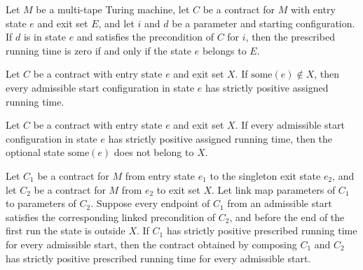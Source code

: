 \begin{theorem}
\label{Turing.Contract.time_eq_zero_iff}
\leanok
{}
Let $M$ be a multi-tape Turing machine, let $C$ be a contract for $M$ with entry state
$e$ and exit set $E$, and let $i$ and $d$ be a parameter and starting configuration. If
$d$ is in state $e$ and satisfies the precondition of $C$ for $i$, then the prescribed
running time is zero if and only if the state $e$ belongs to $E$.
\end{theorem}

\begin{theorem}
\label{Turing.Contract.positive_of_not_mem}
\leanok
{}
Let $C$ be a contract with entry state $e$ and exit set $X$. If
$\mathrm{some}(e)\notin X$, then every admissible start configuration in state $e$ has
strictly positive assigned running time.
\end{theorem}

\begin{theorem}
\label{Turing.Contract.not_mem_of_positive}
\leanok
{}
Let $C$ be a contract with entry state $e$ and exit set $X$. If every admissible start
configuration in state $e$ has strictly positive assigned running time, then the
optional state $\mathrm{some}(e)$ does not belong to $X$.
\end{theorem}

\begin{theorem}
\label{Turing.Contract.trans_positive}
\leanok
{}
Let $C_1$ be a contract for $M$ from entry state $e_1$ to the singleton exit state
$e_2$, and let $C_2$ be a contract for $M$ from $e_2$ to exit set $X$. Let
$\mathrm{link}$ map parameters of $C_1$ to parameters of $C_2$. Suppose every endpoint
of $C_1$ from an admissible start satisfies the corresponding linked precondition of
$C_2$, and before the end of the first run the state is outside $X$. If $C_1$ has
strictly positive prescribed running time for every admissible start, then the contract
obtained by composing $C_1$ and $C_2$ has strictly positive prescribed running time for
every admissible start.
\end{theorem}

